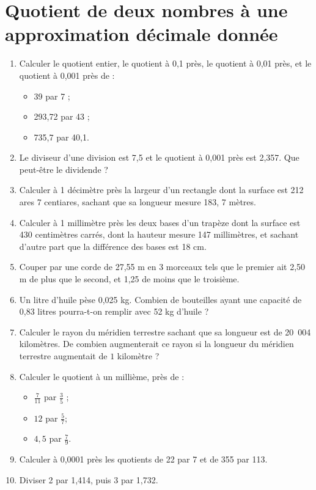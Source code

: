 \documentclass[12 pt]{report}
\theoremstyle{plain}
\newcounter{n}
\begin{document}
 \chapter{Quotient de deux nombres à une approximation décimale donnée}
 
 \begin{enumerate}
 \item Calculer le quotient entier, le quotient à 0,1 près, le quotient à 0,01 près, et le quotient à 0,001 près de : 
 \begin{itemize}
 \item 39 par 7 ;
 \item 293,72 par 43 ; 
 \item 735,7 par 40,1. 
 \end{itemize}
 \item Le diviseur d'une division est 7,5 et le quotient à 0,001 près est 2,357. Que peut-être le dividende ? 
 \item Calculer à 1 décimètre près la largeur d'un rectangle dont la surface est 212 ares 7 centiares, sachant que sa longueur mesure 183, 7 mètres. 
 \item Calculer à 1 millimètre près les deux bases d'un trapèze dont la surface est 430 centimètres carrés, dont la hauteur mesure 147 millimètres, et sachant d'autre part que la différence des bases est 18 cm. 
 \item Couper par une corde de 27,55 m en 3 morceaux tels que le premier ait 2,50 m de plus que le second, et 1,25 de moins que le troisième.
 \item Un litre d'huile pèse 0,025 kg. Combien de bouteilles ayant une capacité de 0,83 litres pourra-t-on remplir avec 52 kg d'huile ? 
 \item Calculer le rayon du méridien terrestre sachant que sa longueur est de 20~004 kilomètres. De combien augmenterait ce rayon si la longueur du méridien terrestre augmentait de $1$ kilomètre ? 
 \item Calculer le quotient à un millième, près de : 
 \begin{itemize}
 \item $\frac7{11}$ par $\frac35$ ; 
 \item $12$ par $\frac57$; 
 \item $4,5$ par $\frac79$. 
 \end{itemize}
\item Calculer à 0,0001 près les quotients de 22 par 7 et de 355 par 113. 
\item Diviser 2 par 1,414, puis 3 par 1,732. 

\end{enumerate}
\end{document}

